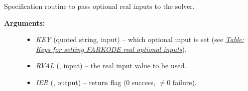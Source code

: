 \documentclass[letterpaper,10pt,english]{sphinxmanual}
\begin{document}
\begin{fulllineitems}
\label{f_interface/Usage:f/_/FARKSETRIN}
Specification routine to pass optional real inputs
to the {\hyperref[f_interface/Usage:f/_/FARKODE]{}} solver.
\begin{description}
\item[{\textbf{Arguments:}}] \leavevmode\begin{itemize}
\item {} 
\emph{KEY} (quoted string, input) -- which optional input
is set (see {\hyperref[f_interface/Usage:finterface-rinoptiontable]{\emph{Table: Keys for setting FARKODE real optional inputs}}}).

\item {} 
\emph{RVAL} (, input) -- the real input value to be used.

\item {} 
\emph{IER} (, output) -- return flag (0 success, $\ne 0$ failure).

\end{itemize}

\end{description}

\end{fulllineitems}
\end{document}
